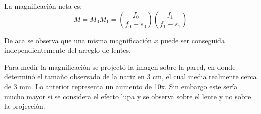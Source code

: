 \documentclass[addpoints,10pt]{exam}
\begin{document}
\begin{questions}
		La magnificaci\'on neta es:
		\begin{equation}
			M = M_0M_1 = \left(\dfrac{f_0}{f_0 - s_0}\right) \left(\dfrac{f_1}{f_1 - s_1}\right)
		\end{equation}
		
		De aca se observa que una misma magnificaci\'on $x$ puede ser conseguida independientemente del arreglo de lentes.
		
		Para medir la magnificaci\'on se project\'o la imagen sobre la pared, en donde determin\'o el tama\~no observado de la nariz en 3 cm, el cual media realmente cerca de 3 mm. Lo anterior representa un aumento de 10x. Sin embargo este ser\'ia mucho mayor si se considera el efecto lupa y se observa sobre el lente y no sobre la projecci\'on.
		
		
	\end{questions}
	
	
\end{document}
